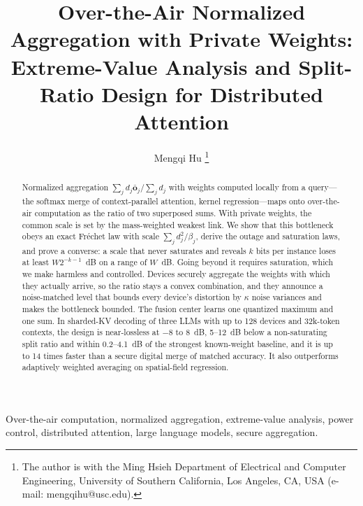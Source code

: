\documentclass[journal]{IEEEtran}
\theoremstyle{plain}
\theoremstyle{definition}
\theoremstyle{remark}
\newcommand{\obar}{\bar{\mathbf{o}}}
\begin{document}
\title{Over-the-Air Normalized Aggregation with Private Weights: Extreme-Value Analysis and Split-Ratio Design for Distributed Attention}

\author{Mengqi Hu%
\thanks{The author is with the Ming Hsieh Department of Electrical and Computer Engineering, University of Southern California, Los Angeles, CA, USA (e-mail: mengqihu@usc.edu).}}


\maketitle

\begin{abstract}
Normalized aggregation $\sum_j d_j\obar_j/\sum_j d_j$ with weights computed locally from a query---the softmax merge of context-parallel attention, kernel regression---maps onto over-the-air computation as the ratio of two superposed sums. With private weights, the common scale is set by the mass-weighted weakest link. We show that this bottleneck obeys an exact Fr\'echet law with scale $\sum_j d_j^2/\beta_j$, derive the outage and saturation laws, and prove a converse: a scale that never saturates and reveals $k$ bits per instance loses at least $W2^{-k-1}$~dB on a range of $W$~dB. Going beyond it requires saturation, which we make harmless and controlled. Devices securely aggregate the weights with which they actually arrive, so the ratio stays a convex combination, and they announce a noise-matched level that bounds every device's distortion by $\kappa$ noise variances and makes the bottleneck bounded. The fusion center learns one quantized maximum and one sum. In sharded-KV decoding of three LLMs with up to 128 devices and 32k-token contexts, the design is near-lossless at $-8$ to $8$~dB, 5--12~dB below a non-saturating split ratio and within 0.2--4.1~dB of the strongest known-weight baseline, and it is up to 14 times faster than a secure digital merge of matched accuracy. It also outperforms adaptively weighted averaging on spatial-field regression.
\end{abstract}

\begin{IEEEkeywords}
Over-the-air computation, normalized aggregation, extreme-value analysis, power control, distributed attention, large language models, secure aggregation.
\end{IEEEkeywords}









\appendices



\end{document}
